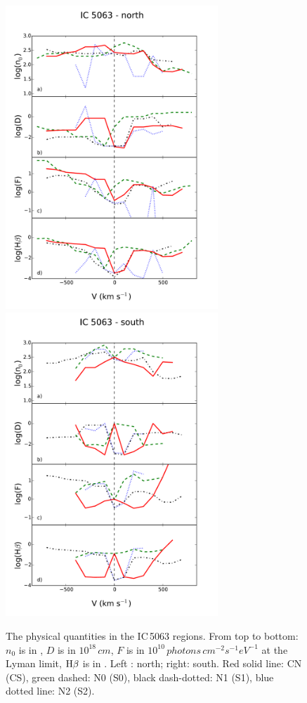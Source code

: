 \documentclass[../main.tex]{subfiles}
\begin{document}
\begin{figure}
\includegraphics[width=8.0cm]{images/paper1/icn.pdf}
\includegraphics[width=8.0cm]{images/paper1/ics.pdf}
\caption{The physical quantities in the IC\,5063 regions. From top to bottom: $n_0$ is in , $D$ is in $10^{18}\,\si{cm}$, $F$ is in $10^{10}\,\si{photons\,cm^{-2} s^{-1} eV^{-1}}$ at the Lyman limit, $\rm H\beta$ is in \erg. Left : north; right: south. Red solid line: CN (CS), green dashed: N0 (S0), black dash-dotted: N1 (S1), blue dotted line: N2 (S2).}
\label{fig:IC_m}
\end{figure}
\end{document}
